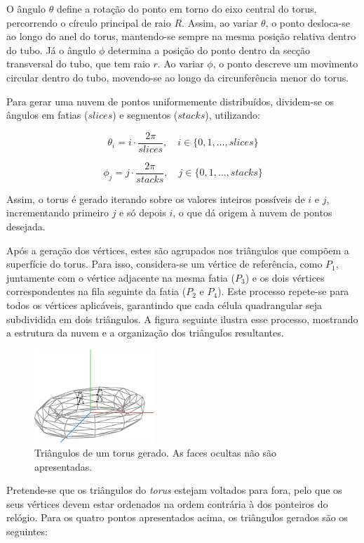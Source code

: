 \documentclass[12pt, a4paper]{article}
\begin{document}
O ângulo $\theta$ define a rotação do ponto em torno do eixo central do torus, percorrendo o
círculo principal de raio $R$. Assim, ao variar $\theta$, o ponto desloca-se ao longo do anel do
torus, mantendo-se sempre na mesma posição relativa dentro do tubo. Já o ângulo $\phi$ determina a
posição do ponto dentro da secção transversal do tubo, que tem raio $r$. Ao variar $\phi$, o ponto
descreve um movimento circular dentro do tubo, movendo-se ao longo da circunferência menor do torus.

Para gerar uma nuvem de pontos uniformemente distribuídos, dividem-se os ângulos em fatias
($slices$) e segmentos ($stacks$), utilizando:

$$
\theta_i = i \cdot \frac{2\pi}{slices}, \quad i \in \{0, 1, \ldots, slices\}
$$

$$
\phi_j = j \cdot \frac{2\pi}{stacks}, \quad j \in \{0, 1, \ldots, stacks\}
$$

Assim, o torus é gerado iterando sobre os valores inteiros possíveis de $i$ e $j$, incrementando
primeiro $j$ e só depois $i$, o que dá origem à nuvem de pontos desejada.

Após a geração dos vértices, estes são agrupados nos triângulos que compõem a superfície do torus.
Para isso, considera-se um vértice de referência, como $P_1$, juntamente com o vértice adjacente
na mesma fatia ($P_3$) e os dois vértices correspondentes na fila seguinte da fatia ($P_2$ e
$P_4$).
Este processo repete-se para todos os vértices aplicáveis, garantindo que cada célula quadrangular
seja subdividida em dois triângulos. A figura seguinte ilustra esse processo, mostrando a estrutura
da nuvem e a organização dos triângulos resultantes.

\begin{figure}[H]
    \centering
    \includegraphics[width=0.4\textwidth]{res/figures/TorusTriangle.pdf}
    \caption{Triângulos de um torus gerado. As faces ocultas não são apresentadas.}
\end{figure}

Pretende-se que os triângulos do \emph{torus} estejam voltados para fora, pelo que os seus vértices
devem estar ordenados na ordem contrária à dos ponteiros do relógio. Para os quatro pontos
apresentados acima, os triângulos gerados são os seguintes:
\end{document}
